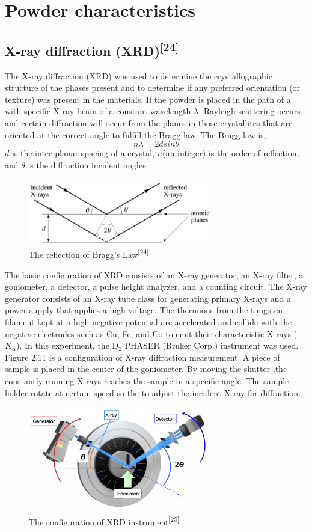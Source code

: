 \section{Powder characteristics}
\subsection{X-ray diffraction (XRD)\textsuperscript{[24]}}
The X-ray diffraction (XRD) was used to determine the crystallographic structure of the phases present and to determine if any preferred orientation (or texture) was present in the materials. If the powder is placed in the path of a with specific X-ray beam of a constant wavelength $\lambda$, Rayleigh scattering occurs and certain diffraction will occur from the planes in those crystallites that are oriented at the correct angle to fulfill the Bragg law.
The Bragg law is,
$$n\lambda=2dsin\theta$$
$d$ is the inter planar spacing of a crystal, $n$(an integer) is the order of reﬂection, and $\theta$ is the diffraction incident angles.
\begin{figure}[H]
\centering
\includegraphics[width=8cm]{src/fig/fig25.png}
\caption{The reflection of Bragg's Law\textsuperscript{[24]} }
\end{figure}
The basic configuration of XRD consists of an X-ray generator, an X-ray filter, a goniometer, a detector, a pulse height analyzer, and a counting circuit. The X-ray generator consists of an X-ray tube class for generating primary X-rays and a power supply that applies a high voltage. The thermions from the tungsten filament kept at a high negative potential are accelerated and collide with the negative electrodes such as Cu, Fe, and Co to emit their characteristic X-rays ($K_\alpha$).  
In this experiment, the $\mathrm{D_{2}}$ PHASER (Bruker Corp.) instrument was
used. Figure 2.11 is a configuration  of X-ray diffraction measurement. A piece of sample is placed in the center of the goniometer. By moving the shutter ,the constantly running X-rays reaches the sample in a specific angle. The sample holder  rotate at certain speed so the to adjust the incident X-ray for diffraction. 
\begin{figure}[H]
\centering
\includegraphics[width=8cm]{src/fig/fig26.png}
\caption{The configuration of XRD instrument\textsuperscript{[25]}}
\end{figure}

